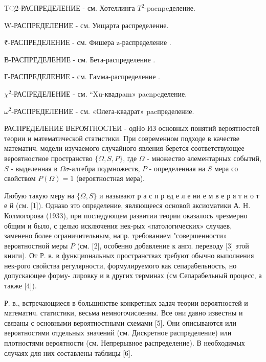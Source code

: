 \documentclass[10pt]{article}
\begin{document}
T्2-РАСПРЕДЕЛЕНИЕ - см. Хотеллинга $T^{2}$-pacnpeделение.



W-РАСПРЕДЕЛЕНИЕ - см. Уищарта распределение.



₹-РАСПРЕДЕЛЕНИЕ - см. Фишера z-распределение .



В-РАСПРЕДЕЛЕНИЕ - см. Бета-распределение .



Г-РАСПРЕДЕЛЕНИЕ - см. Гамма-распределение .



$\chi^{2}$-РАСІРЕДЕЛЕНИЕ - см. “Xu-квадpam» pacnpeделение.



$\omega^{2}$-РАСПРЕДЕЛЕНИЕ - см. «Олега-квадрат» pacпределение.



РАСПРЕДЕЛЕНИЕ ВЕРОЯТНОСТЕИ - одНо ИЗ основных понятий вероятностей теории и математической статистики. При современном подходе в качестве математич. модели изучаемого случайного явления берется соответствующее вероятностное пространство $\{\Omega, S, P\}$, где $\Omega$ - множество әлементарных событий, $S$ - выделенная в $\Omega \sigma$-алгебра подмножеств, $P$ - определенная на $S$ мера со свойством $P(\Omega)=1$ (вероятностная мера).



Любую такую меру на $\{\Omega, S\}$ и называют р а с п р ед е л е ни е м в е р я т н о т е й (см. [1]). Однако это определение, являющееся основой аксиоматики А. Н. Колмогорова (1933), при последующем развитии теории оказалось чрезмерно общим и было, с целью исключения нек-рых «патологических» случаев, заменено более ограничительным, напр. требованием "совершенности» вероятностной меры $P$ (см. [2], особенно добавление к англ. переводу [3] этой книги). От Р. в. в функциональных пространствах требуют обычно выполнения нек-рого свойства регулярности, формулируемого как сепарабельность, но допускающее форму- лировку и в других терминах (см Сепарабельный процесс, а также [4]).



Р. в., встречающиеся в большинстве конкретных задач теории вероятностей и математич. статистики, весьма немногочисленны. Все они давно известны и связаны с основными вероятностными схемами [5]. Они описываются или вероятностями отдельных значений (см. Дискретное распределение) или плотностями вероятности (см. Непрерывное распределение). В необходимых случаях для них составлены таблицы [6].
\end{document}
